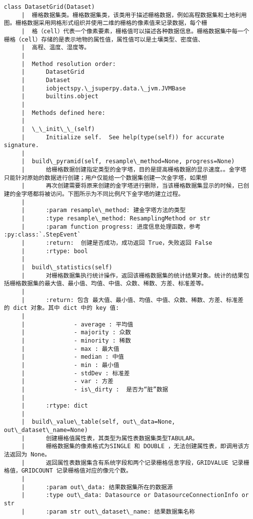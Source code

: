 \documentclass[11pt]{article}
\begin{document}
\begin{Verbatim}[commandchars=\\\{\}]
    class DatasetGrid(Dataset)
     |  栅格数据集类。栅格数据集类，该类用于描述栅格数据，例如高程数据集和土地利用图。栅格数据采用网格形式组织并使用二维的栅格的像素值来记录数据，每个栅
     |  格（cell）代表一个像素要素，栅格值可以描述各种数据信息。栅格数据集中每一个栅格（cell）存储的是表示地物的属性值，属性值可以是土壤类型、密度值、
     |  高程、温度、湿度等。
     |  
     |  Method resolution order:
     |      DatasetGrid
     |      Dataset
     |      iobjectspy.\_jsuperpy.data.\_jvm.JVMBase
     |      builtins.object
     |  
     |  Methods defined here:
     |  
     |  \_\_init\_\_(self)
     |      Initialize self.  See help(type(self)) for accurate signature.
     |  
     |  build\_pyramid(self, resample\_method=None, progress=None)
     |      给栅格数据创建指定类型的金字塔，目的是提高栅格数据的显示速度。。金字塔只能针对原始的数据进行创建；用户仅能给一个数据集创建一次金字塔，如果想
     |      再次创建需要将原来创建的金字塔进行删除，当该栅格数据集显示的时候，已创建的金字塔都将被访问。下图所示为不同比例尺下金字塔的建立过程。
     |      
     |      :param resample\_method: 建金字塔方法的类型
     |      :type resample\_method: ResamplingMethod or str
     |      :param function progress: 进度信息处理函数，参考 :py:class:`.StepEvent`
     |      :return:  创建是否成功，成功返回 True，失败返回 False
     |      :rtype: bool
     |  
     |  build\_statistics(self)
     |      对栅格数据集执行统计操作，返回该栅格数据集的统计结果对象。统计的结果包括栅格数据集的最大值、最小值、均值、中值、众数、稀数、方差、标准差等。
     |      
     |      :return: 包含 最大值、最小值、均值、中值、众数、稀数、方差、标准差 的 dict 对象。其中 dict 中的 key 值:
     |      
     |              - average : 平均值
     |              - majority : 众数
     |              - minority : 稀数
     |              - max : 最大值
     |              - median : 中值
     |              - min : 最小值
     |              - stdDev : 标准差
     |              - var : 方差
     |              - is\_dirty :  是否为“脏”数据
     |      
     |      :rtype: dict
     |  
     |  build\_value\_table(self, out\_data=None, out\_dataset\_name=None)
     |      创建栅格值属性表，其类型为属性表数据集类型TABULAR。
     |      栅格数据集的像素格式为SINGLE 和 DOUBLE ，无法创建属性表，即调用该方法返回为 None。
     |      返回属性表数据集含有系统字段和两个记录栅格信息字段，GRIDVALUE 记录栅格值，GRIDCOUNT 记录栅格值对应的像元个数。
     |      
     |      :param out\_data: 结果数据集所在的数据源
     |      :type out\_data: Datasource or DatasourceConnectionInfo or str
     |      :param str out\_dataset\_name: 结果数据集名称

\end{Verbatim}
\end{document}
